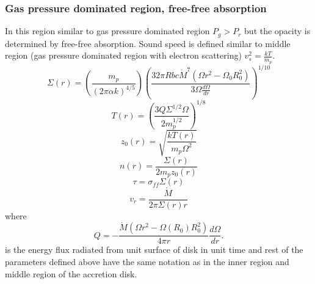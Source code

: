 \documentclass[useAMS,usenatbib]{mn2e}
\begin{document}
\subsubsection{Gas pressure dominated region, free-free absorption}
In this region similar to gas pressure dominated region $P_g > P_r$ but the opacity is determined by free-free absorption. Sound speed is defined similar to middle region (gas pressure dominated region with electron scattering) $v^2_s = \frac{kT}{m_p}$.
\begin{equation}
\Sigma (r) = \left(\frac{m_p}{(2\pi\alpha k)^{4/5}}\right)\left(\frac{32\pi R bc \dot{M}^7\left(\Omega r^2 - \Omega_0 R_0^2\right)}{3\Omega\frac{d\Omega}{dr}}\right)^{1/10}
\end{equation}
\begin{equation}
T(r) = \left(\frac{3Q \Sigma^{1/2}\Omega}{2 m_p^{1/2}}\right)^{1/8}
\end{equation}
\begin{equation}
z_0(r) = \sqrt{\frac{k T(r)}{m_p\Omega^2}}
\end{equation}
\begin{equation}
n(r) = \frac{\Sigma(r)}{2m_p z_0(r)}
\end{equation}
\begin{equation}
\tau = \sigma_{ff}\Sigma(r)
\end{equation}
\begin{equation}
v_r = \frac{\dot{M}}{2\pi\Sigma(r) r}
\end{equation}
where 
\begin{equation}
Q = -\frac{\dot{M}\left(\Omega r^2 - \Omega(R_0)R_0^2\right)}{4\pi r}\frac{d\Omega}{dr}.
\end{equation}
is the energy flux radiated from unit surface of disk in unit time and rest of the parameters defined above have the same notation as in the inner region and middle region of the accretion disk. 
\end{document}
